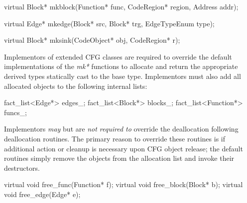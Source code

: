 \begin{apient}
virtual Block* mkblock(Function* func,
                       CodeRegion* region,
                       Address addr);
\end{apient}

\begin{apient}
virtual Edge* mkedge(Block* src,
                     Block* trg,
                     EdgeTypeEnum type);
\end{apient}

\begin{apient}
virtual Block* mksink(CodeObject* obj,
                      CodeRegion* r);
\end{apient}

Implementors of extended CFG classes are required to override the default implementations of the \emph{mk*} functions to allocate and return the appropriate derived types statically cast to the base type. Implementors must also add all allocated objects to the following internal lists:

\begin{apient}
fact_list<Edge*> edges_;
fact_list<Block*> blocks_;
fact_list<Function*> funcs_;
\end{apient}

Implementors \emph{may} but are \emph{not required to} override the
deallocation following deallocation routines. The primary reason to override
these routines is if additional action or cleanup is necessary upon CFG object
release; the default routines simply remove the objects from the allocation
list and invoke their destructors.

\begin{apient}
virtual void free_func(Function* f);
virtual void free_block(Block* b);
virtual void free_edge(Edge* e);
\end{apient}

